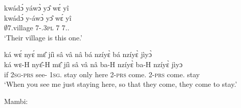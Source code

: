 \begin{exe}[(C234)]
\exC\label{149} 
  \glll  kwádɔ́ yáwɔ̀ yɔ̂ wɛ́ yî \\
          kwádɔ́ y-áwɔ̀ yɔ̂ wɛ́ yî \\
         $\emptyset$7.village 7-{\POSS}.3\textsc{pl} 7 {\ID} 7.{\DEM}.{\PROX}   \\
    \trans `Their village is this one.'
 
\exC\label{150}
  \glll  ká wɛ́ nyɛ́ mɛ̂ jíì sâ vâ nâ bá nzíyɛ̀ bá nzíyɛ̀ jìyɔ̀ \\
       ká wɛ-H nyɛ̂-H mɛ̂ jíì sâ vâ nâ ba-H nzíyɛ̀ ba-H nzíyɛ̀ jìyɔ \\
         if 2\textsc{sg}-\textsc{prs} see-{\R} 1\textsc{sg}.{\OBJ} stay only here {\COMP} 2-\textsc{prs} come.{\SBJV}  2-\textsc{prs} come.{\SBJV}  stay   \\
    \trans `When you see me just staying here, so that they come, they come to stay.'
\end{exe}

\noindent Mambi:

